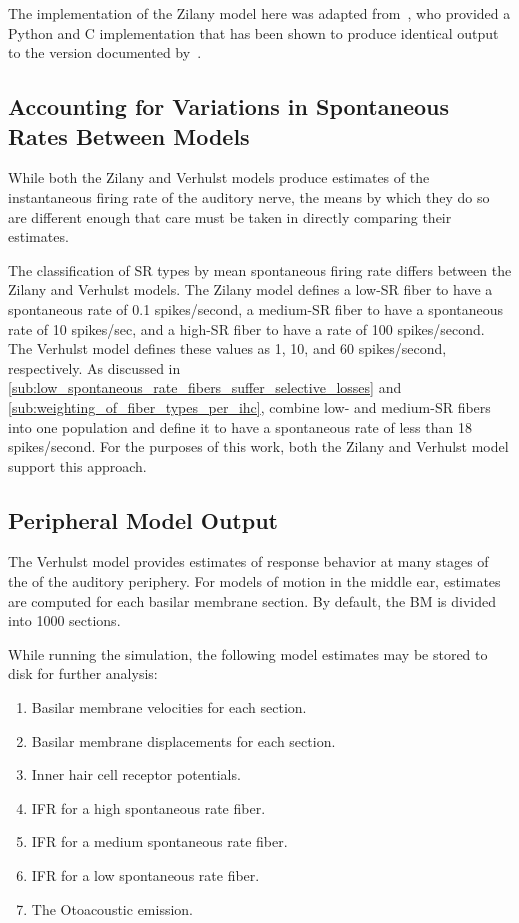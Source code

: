 The implementation of the Zilany model here was adapted from~\cite{Rudnicki2014Cochlea}, who provided a Python and C implementation that has been shown to produce identical output to the version documented by~\cite{Zilany2014Updated}.

\subsection{Accounting for Variations in Spontaneous Rates Between Models} %
\label{sub:interoperability_of_the_zilany_and_verhulst_models}
While both the Zilany and Verhulst models produce estimates of the instantaneous firing rate of the auditory nerve, the means by which they do so are different enough that care must be taken in directly comparing their estimates.  

The classification of SR types by mean spontaneous firing rate differs between the Zilany and Verhulst models.  The Zilany model defines a low-SR fiber to have a spontaneous rate of 0.1 spikes/second, a medium-SR fiber to have a spontaneous rate of 10 spikes/sec, and a high-SR fiber to have a rate of 100 spikes/second.  The Verhulst model defines these values as 1, 10, and 60 spikes/second, respectively.  As discussed in \autoref{sub:low_spontaneous_rate_fibers_suffer_selective_losses} and \autoref{sub:weighting_of_fiber_types_per_ihc}, \citeauthor{Temchin2008Threshold} combine low- and medium-SR fibers into one population and define it to have a spontaneous rate of less than 18 spikes/second.  For the purposes of this work, both the Zilany and Verhulst model support this approach.


\subsection{Peripheral Model Output} %
\label{sub:peripheral_model_output}
The Verhulst model provides estimates of response behavior at many stages of the of the auditory periphery.   For models of motion in the middle ear, estimates are computed for each basilar membrane section.  By default, the BM is divided into 1000 sections. 

 While running the simulation, the following model estimates may be stored to disk for further analysis: 
\begin{enumerate}
	\item Basilar membrane velocities for each section.
	\item Basilar membrane displacements for each section.
	\item Inner hair cell receptor potentials. 
	\item IFR for a high spontaneous rate fiber.
	\item IFR for a medium spontaneous rate fiber.
	\item IFR for a low spontaneous rate fiber. 
	\item The Otoacoustic emission. 
\end{enumerate}


